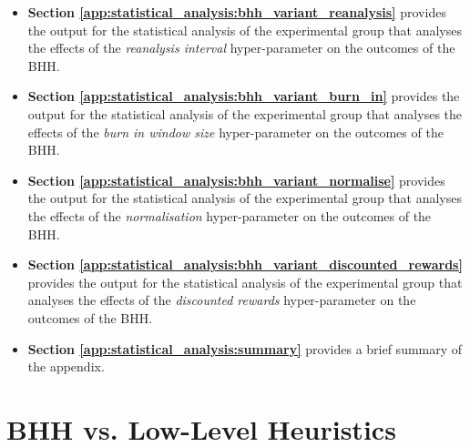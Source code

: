 \begin{itemize}
	\item \textbf{Section \ref{app:statistical_analysis:bhh_variant_reanalysis}} provides the output for the statistical analysis of the experimental group that analyses the effects of the \textit{reanalysis interval} hyper-parameter on the outcomes of the \acs{BHH}.

	\item \textbf{Section \ref{app:statistical_analysis:bhh_variant_burn_in}} provides the output for the statistical analysis of the experimental group that analyses the effects of the \textit{burn in window size} hyper-parameter on the outcomes of the \acs{BHH}.

	\item \textbf{Section \ref{app:statistical_analysis:bhh_variant_normalise}} provides the output for the statistical analysis of the experimental group that analyses the effects of the \textit{normalisation} hyper-parameter on the outcomes of the \acs{BHH}.

	\item \textbf{Section \ref{app:statistical_analysis:bhh_variant_discounted_rewards}} provides the output for the statistical analysis of the experimental group that analyses the effects of the \textit{discounted rewards} hyper-parameter on the outcomes of the \acs{BHH}.

	\item \textbf{Section \ref{app:statistical_analysis:summary}} provides a brief summary of the appendix.
\end{itemize}


\section{BHH vs. Low-Level Heuristics}\label{app:statistical_analysis:bhh_vs_low_level_heuristics}

